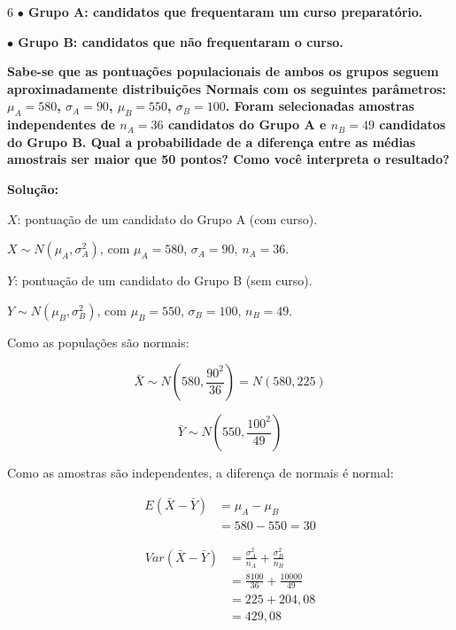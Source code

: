 \documentclass[8pt, a4paper, landscape]{extarticle}
\begin{document}
\begin{multicols}{6}
\textbf{$\bullet$ Grupo A: candidatos que frequentaram um curso preparatório.}

\textbf{$\bullet$ Grupo B: candidatos que não frequentaram o curso.}

\textbf{Sabe-se que as pontuações populacionais de ambos os grupos seguem aproximadamente distribuições Normais com os seguintes parâmetros: $\mu_A = 580$, $\sigma_A = 90$, $\mu_B = 550$, $\sigma_B = 100$. Foram selecionadas amostras independentes de $n_A = 36$ candidatos do Grupo A e $n_B = 49$ candidatos do Grupo B. Qual a probabilidade de a diferença entre as médias amostrais ser maior que 50 pontos? Como você interpreta o resultado?}

\vspace{0.3cm}

\textbf{Solução:}

$X$: pontuação de um candidato do Grupo A (com curso).

$X \sim N(\mu_A, \sigma_A^2)$, com $\mu_A = 580$, $\sigma_A = 90$, $n_A = 36$.

$Y$: pontuação de um candidato do Grupo B (sem curso).

$Y \sim N(\mu_B, \sigma_B^2)$, com $\mu_B = 550$, $\sigma_B = 100$, $n_B = 49$.

Como as populações são normais:

\begin{equation*}
\bar{X} \sim N\left(580, \frac{90^2}{36}\right) = N(580, 225)
\end{equation*}

\begin{equation*}
\bar{Y} \sim N\left(550, \frac{100^2}{49}\right)
\end{equation*}

Como as amostras são independentes, a diferença de normais é normal:

\begin{equation*}
\begin{split}
E(\bar{X} - \bar{Y}) &= \mu_A - \mu_B \\
&= 580 - 550 = 30
\end{split}
\end{equation*}

\begin{equation*}
\begin{split}
Var(\bar{X} - \bar{Y}) &= \frac{\sigma_A^2}{n_A} + \frac{\sigma_B^2}{n_B} \\
&= \frac{8100}{36} + \frac{10000}{49} \\
&= 225 + 204,08 \\
&= 429,08
\end{split}
\end{equation*}


\end{multicols}
\end{document}
